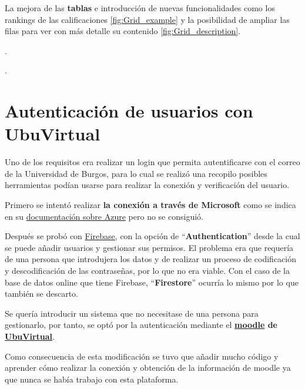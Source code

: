 
La mejora de las \textbf{tablas} e introducción de nuevas funcionalidades como los rankings de las calificaciones \ref{fig:Grid_example} y la posibilidad de ampliar las filas para ver con más detalle su contenido \ref{fig:Grid_description}.

.

.

\section{Autenticación de usuarios con UbuVirtual}

Uno de los requisitos era realizar un login que permita autentificarse con el correo de la Universidad de Burgos, para lo cual se realizó una recopilo posibles herramientas podían usarse para realizar la conexión y verificación del usuario.

Primero se intentó realizar \textbf{la conexión a través de Microsoft} como se indica en su \href{https://docs.microsoft.com/en-us/azure/active-directory/develop/quickstart-v2-java-webapp}{documentación sobre Azure} pero no se consiguió.

Después se probó con \href{https://firebase.google.com/}{Firebase}, con la opción de ``\textbf{Authentication}'' desde la cual se puede añadir usuarios y gestionar sus permisos. El problema era que requería de una persona que introdujera los datos y de realizar un proceso de codificación y descodificación de las contraseñas, por lo que no era viable. Con el caso de la base de datos online que tiene Firebase, ``\textbf{Firestore}'' ocurría lo mismo por lo que también se descarto.  

Se quería introducir un sistema que no necesitase de una persona para gestionarlo, por tanto, se optó por la autenticación mediante el \textbf{\href{https://moodle.org/}{moodle} de \href{https://ubuvirtual.ubu.es/}{UbuVirtual}}. 

Como consecuencia de esta modificación se tuvo que añadir mucho código y aprender cómo realizar la conexión y obtención de la información de moodle ya que nunca se había trabajo con esta plataforma.
